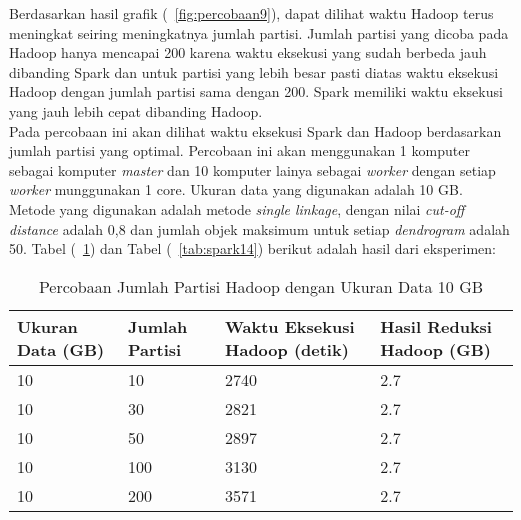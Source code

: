 Berdasarkan hasil grafik (~\ref{fig:percobaan9}), dapat dilihat waktu Hadoop terus meningkat seiring meningkatnya jumlah partisi. Jumlah partisi yang dicoba pada Hadoop hanya mencapai 200 karena waktu eksekusi yang sudah berbeda jauh dibanding Spark dan untuk partisi yang lebih besar pasti diatas waktu eksekusi Hadoop dengan jumlah partisi sama dengan 200. Spark memiliki waktu eksekusi yang jauh lebih cepat dibanding Hadoop.\\  



Pada percobaan ini akan dilihat waktu eksekusi Spark dan Hadoop berdasarkan jumlah partisi yang optimal. Percobaan ini akan menggunakan 1 komputer sebagai komputer \textit{master} dan 10 komputer lainya sebagai \textit{worker} dengan setiap \textit{worker} munggunakan 1 core. Ukuran data yang digunakan adalah 10 GB. Metode yang digunakan adalah metode \textit{single linkage}, dengan nilai \textit{cut-off distance} adalah 0,8 dan jumlah objek maksimum untuk setiap \textit{dendrogram} adalah 50. Tabel (~\ref{tab:spark13}) dan Tabel (~\ref{tab:spark14}) berikut adalah hasil dari eksperimen:





\begin{table}[H] 
	\centering 
	\caption{Percobaan Jumlah Partisi Hadoop dengan Ukuran Data 10 GB}
	\label{tab:spark13}
	\begin{tabular}{|p{3cm}|p{3cm}|p{4cm}|p{4cm}|}
\hline
Ukuran Data (GB) & Jumlah Partisi &  Waktu Eksekusi Hadoop (detik) & Hasil Reduksi Hadoop (GB)\\
\hline
10 & 10 & 2740  & 2.7  \\
\hline
10 & 30 & 2821  & 2.7  \\
\hline
10 & 50 & 2897 & 2.7   \\
\hline
10 & 100 & 3130 & 2.7   \\
\hline
10 & 200 & 3571 & 2.7   \\
\hline


\hline

	\end{tabular} 
\end{table}




